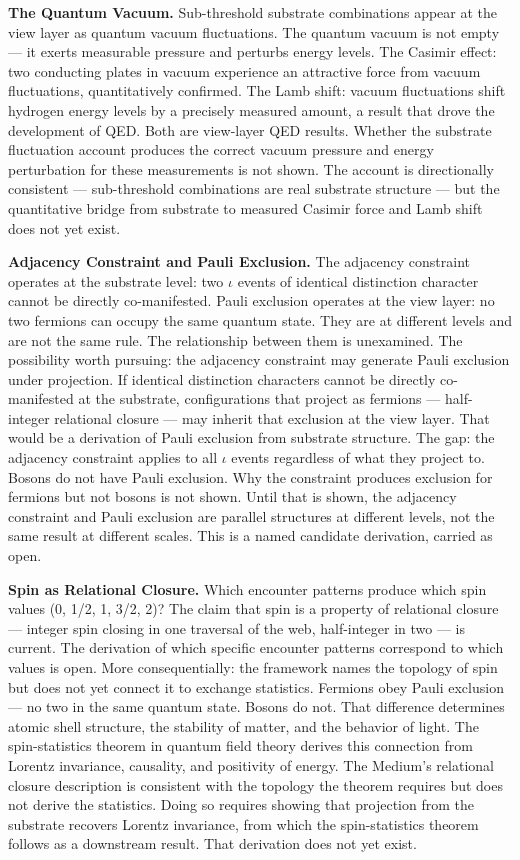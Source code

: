 \documentclass[11pt,letterpaper]{article}
\begin{document}
\textbf{The Quantum Vacuum.} Sub-threshold substrate combinations appear at the view layer as quantum vacuum fluctuations. The quantum vacuum is not empty --- it exerts measurable pressure and perturbs energy levels. The Casimir effect: two conducting plates in vacuum experience an attractive force from vacuum fluctuations, quantitatively confirmed. The Lamb shift: vacuum fluctuations shift hydrogen energy levels by a precisely measured amount, a result that drove the development of QED. Both are view-layer QED results. Whether the substrate fluctuation account produces the correct vacuum pressure and energy perturbation for these measurements is not shown. The account is directionally consistent --- sub-threshold combinations are real substrate structure --- but the quantitative bridge from substrate to measured Casimir force and Lamb shift does not yet exist.

\textbf{Adjacency Constraint and Pauli Exclusion.} The adjacency constraint operates at the substrate level: two \(\iota\) events of identical distinction character cannot be directly co-manifested. Pauli exclusion operates at the view layer: no two fermions can occupy the same quantum state. They are at different levels and are not the same rule. The relationship between them is unexamined. The possibility worth pursuing: the adjacency constraint may generate Pauli exclusion under projection. If identical distinction characters cannot be directly co-manifested at the substrate, configurations that project as fermions --- half-integer relational closure --- may inherit that exclusion at the view layer. That would be a derivation of Pauli exclusion from substrate structure. The gap: the adjacency constraint applies to all \(\iota\) events regardless of what they project to. Bosons do not have Pauli exclusion. Why the constraint produces exclusion for fermions but not bosons is not shown. Until that is shown, the adjacency constraint and Pauli exclusion are parallel structures at different levels, not the same result at different scales. This is a named candidate derivation, carried as open.

\textbf{Spin as Relational Closure.} Which encounter patterns produce which spin values (0, 1/2, 1, 3/2, 2)? The claim that spin is a property of relational closure --- integer spin closing in one traversal of the web, half-integer in two --- is current. The derivation of which specific encounter patterns correspond to which values is open. More consequentially: the framework names the topology of spin but does not yet connect it to exchange statistics. Fermions obey Pauli exclusion --- no two in the same quantum state. Bosons do not. That difference determines atomic shell structure, the stability of matter, and the behavior of light. The spin-statistics theorem in quantum field theory derives this connection from Lorentz invariance, causality, and positivity of energy. The Medium's relational closure description is consistent with the topology the theorem requires but does not derive the statistics. Doing so requires showing that projection from the substrate recovers Lorentz invariance, from which the spin-statistics theorem follows as a downstream result. That derivation does not yet exist.
\end{document}
